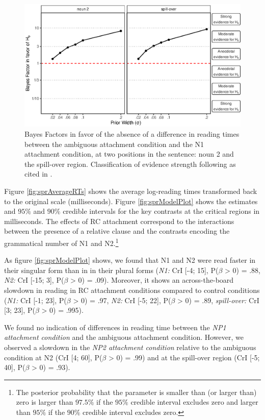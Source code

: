 \documentclass[english, doc]{apa7}\usepackage[]{graphicx}\usepackage[]{color}
\makeatletter
\def\maxwidth{ %
  \ifdim\Gin@nat@width>\linewidth
    \linewidth
  \else
    \Gin@nat@width
  \fi
}
\makeatother
\begin{document}
\begin{figure}
\includegraphics[width=\maxwidth]{./figure/exp2_BFs.eps} 
\caption{Bayes Factors in favor of the absence of a difference in reading times between the ambiguous attachment condition and the N1 attachment condition, at two positions in the sentence: noun 2 and the spill-over region. Classification of evidence strength following \citet{Jeffreys:1961} as cited in \citet{LeeWagenmakers:2014}.
}
\label{fig:EyeBFs2}
\end{figure}


Figure \ref{fig:sprAverageRTs} shows the average log-reading times transformed back to the original scale (milliseconds). Figure \ref{fig:sprModelPlot} shows the estimates and $95\%$ and $90\%$ credible intervals for the key contrasts at the critical regions in milliseconds.
The effects of RC attachment correspond to the interactions between the presence of a relative clause and the contrasts encoding the grammatical number of N1 and N2.\footnote{The posterior probability that the parameter is smaller than (or larger than) zero is larger than $97.5\%$ if the $95\%$ credible interval excludes zero and larger than $95\%$ if the $90\%$ credible interval excludes zero.}

As figure \ref{fig:sprModelPlot} shows, 
we found that N1 and N2 were read faster in their singular form than in in their plural forms 
(\emph{N1:} 
CrI [-4; 15], P($\beta$ > 0) =    .88,
\emph{N2:} 
CrI [-15; 3], P($\beta$ > 0) =    .09). 
%
Moreover, it shows an across-the-board slowdown in reading in RC attachment conditions compared to control conditions
(\emph{N1:}
CrI [-1; 23], P($\beta$ > 0) =    .97,
\emph{N2:}
CrI [-5; 22], P($\beta$ > 0) =    .89,
\emph{spill-over:}
CrI [3; 23], P($\beta$ > 0) =   .995).

We found no indication of differences in reading time between the \emph{NP1 attachment condition} and the ambiguous attachment condition.
%
However, we observed a slowdown in the \emph{NP2 attachment condition} relative to the ambiguous condition at N2
(CrI [4; 60], P($\beta$ > 0) =    .99)
and at the spill-over region
(CrI [-5; 40], P($\beta$ > 0) =    .93).
\end{document}
